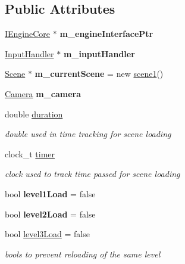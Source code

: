 \subsection*{Public Attributes}
\begin{DoxyCompactItemize}
\item 
\mbox{\label{class_game_ad01d32edc479a3edc79e5a3d7b4281d2}} 
\mbox{\hyperlink{class_i_engine_core}{I\+Engine\+Core}} $\ast$ {\bfseries m\+\_\+engine\+Interface\+Ptr}
\item 
\mbox{\label{class_game_a001f55f492c3fbafe8cf27eb04df293c}} 
\mbox{\hyperlink{struct_input_handler}{Input\+Handler}} $\ast$ {\bfseries m\+\_\+input\+Handler}
\item 
\mbox{\label{class_game_ad6a7b4699f55c3ba069aef8271d42d60}} 
\mbox{\hyperlink{class_scene}{Scene}} $\ast$ {\bfseries m\+\_\+current\+Scene} = new \mbox{\hyperlink{classscene1}{scene1}}()
\item 
\mbox{\label{class_game_a1246a08959809a361ac3eab55f124698}} 
\mbox{\hyperlink{class_camera}{Camera}} {\bfseries m\+\_\+camera}
\item 
\mbox{\label{class_game_a5ec0d2343999d0f1f2f1ec20a24c343b}} 
double \mbox{\hyperlink{class_game_a5ec0d2343999d0f1f2f1ec20a24c343b}{duration}}
\begin{DoxyCompactList}\small\item\em double used in time tracking for scene loading \end{DoxyCompactList}\item 
\mbox{\label{class_game_a00c8ac7aac5917077638ef797eaed5ce}} 
clock\+\_\+t \mbox{\hyperlink{class_game_a00c8ac7aac5917077638ef797eaed5ce}{timer}}
\begin{DoxyCompactList}\small\item\em clock used to track time passed for scene loading \end{DoxyCompactList}\item 
\mbox{\label{class_game_a86c92e28e4972a220f9dca7d31ecf124}} 
bool {\bfseries level1\+Load} = false
\item 
\mbox{\label{class_game_a6a8a282f52f224bc53cc6297297ba405}} 
bool {\bfseries level2\+Load} = false
\item 
\mbox{\label{class_game_a8173b1d71de83055abd95ee54dd27392}} 
bool \mbox{\hyperlink{class_game_a8173b1d71de83055abd95ee54dd27392}{level3\+Load}} = false
\begin{DoxyCompactList}\small\item\em bools to prevent reloading of the same level \end{DoxyCompactList}\end{DoxyCompactItemize}


